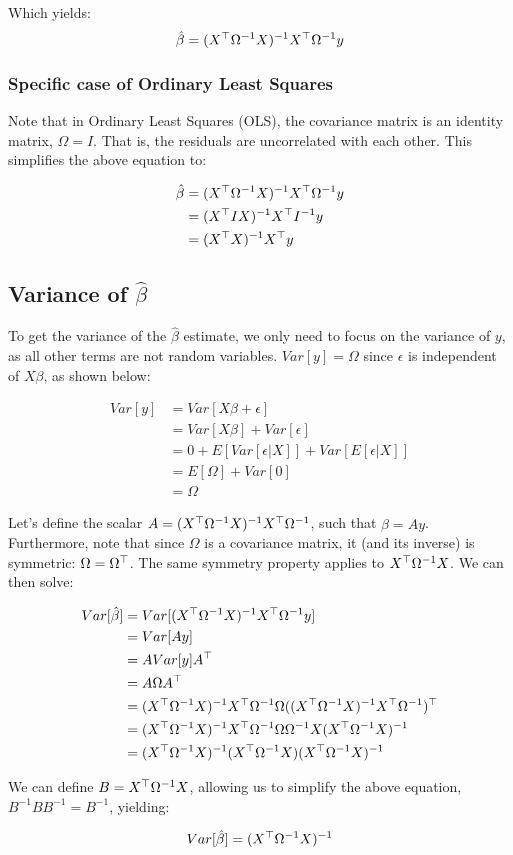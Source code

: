 \documentclass[12pt]{article}
\begin{document}
Which yields:
$$ \hat{\beta} = (X^{\operatorname*{\top}} \Omega^{-1} X)^{-1} X^{\operatorname*{\top}} \Omega^{-1} y $$

\subsubsection{Specific case of Ordinary Least Squares}

Note that in Ordinary Least Squares (OLS), the covariance matrix is an identity matrix, $\Omega = I$. That is, the residuals are uncorrelated with each other. This simplifies the above equation to:

\begin{align*}
    \hat{\beta} &= (X^{\operatorname*{\top}} \Omega^{-1} X)^{-1} X^{\operatorname*{\top}} \Omega^{-1} y \\
    &= (X^{\operatorname*{\top}} I X)^{-1} X^{\operatorname*{\top}} I^{-1} y \\
    &= (X^{\operatorname*{\top}} X)^{-1} X^{\operatorname*{\top}} y
\end{align*}



\subsection[Variance of beta-hat]{Variance of $\hat{\beta}$}

To get the variance of the $\hat{\beta}$ estimate, we only need to focus on the variance of $y$, as all other terms are not random variables. $Var[y] = \Omega$ since $\epsilon$ is independent of $X \beta$, as shown below:

\begin{align*}
    Var[y] &= Var[X \beta + \epsilon] \\
    &= Var[X \beta] + Var[\epsilon] \\
    &= 0 + E[ Var[\epsilon | X] ] + Var[ E[\epsilon | X]] \\
    &= E[ \Omega ] + Var[ 0 ] \\ 
    &= \Omega
\end{align*}

Let's define the scalar $A = (X^{\operatorname*{\top}} \Omega^{-1} X)^{-1} X^{\operatorname*{\top}} \Omega^{-1}$, such that $\hat{\beta} = A y$. Furthermore, note that since $\Omega$ is a covariance matrix, it (and its inverse) is symmetric: $\Omega = \Omega^{\operatorname*{\top}}$. The same symmetry property applies to $X^{\operatorname*{\top}} \Omega^{-1} X$. We can then solve:

\begin{align*}
    Var[ \hat{\beta} ] &= Var[(X^{\operatorname*{\top}} \Omega^{-1} X)^{-1} X^{\operatorname*{\top}} \Omega^{-1} y] \\
    &= Var[A y] \\
    &= A Var[y] A^{\operatorname*{\top}} \\
    &= A \Omega A^{\operatorname*{\top}} \\
    &= (X^{\operatorname*{\top}} \Omega^{-1} X)^{-1} X^{\operatorname*{\top}} \Omega^{-1} \Omega ((X^{\operatorname*{\top}} \Omega^{-1} X)^{-1} X^{\operatorname*{\top}} \Omega^{-1})^{\operatorname*{\top}} \\
    &= (X^{\operatorname*{\top}} \Omega^{-1} X)^{-1} X^{\operatorname*{\top}} \Omega^{-1} \Omega \Omega^{-1} X (X^{\operatorname*{\top}} \Omega^{-1} X)^{-1} \\
    &= (X^{\operatorname*{\top}} \Omega^{-1} X)^{-1} (X^{\operatorname*{\top}} \Omega^{-1} X) (X^{\operatorname*{\top}} \Omega^{-1} X)^{-1}
\end{align*}

We can define $B = X^{\operatorname*{\top}} \Omega^{-1} X$, allowing us to simplify the above equation, $B^{-1} B B^{-1} = B^{-1}$, yielding:

$$ Var[ \hat{\beta} ] = (X^{\operatorname*{\top}} \Omega^{-1} X)^{-1} $$
\end{document}

